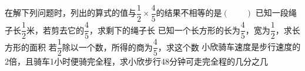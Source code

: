 在解下列问题时，列出的算式的值与$\dfrac{1}{2}×\dfrac{4}{5}$的结果不相等的是\hfill$\left(\qquad\right)$\fourchoices
{已知一段绳子长$\dfrac{1}{2}$米，若剪去它的$\dfrac{4}{5}$，求剩下的绳子长}
{已知一个长方形的长为$\dfrac{4}{5}$，宽为$\dfrac{1}{2}$，求长方形的面积}
{若$\dfrac{1}{2}$除以一个数，所得的商为$\dfrac{4}{5}$，求这个数}
{小欣骑车速度是步行速度的2倍，且骑车1小时便骑完全程，求小欣步行48分钟可走完全程的几分之几}